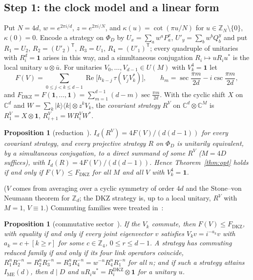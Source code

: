 \documentclass[11pt]{article}
\newtheorem{proposition}[lemma]{Proposition}
\theoremstyle{remark}
\numberwithin{equation}{section}
\newcommand{\Z}{\mathbb{Z}}
\newcommand{\C}{\mathbb{C}}
\renewcommand{\Re}{\operatorname{Re}}
\newcommand{\IME}{I_{\mathrm{ME}}}
\newcommand{\FD}{F_{\mathrm{DKZ}}}
\newcommand{\one}{\mathbf{1}}
\newcommand{\DKZ}{\mathrm{DKZ}}
\begin{document}
\subsection{Step 1: the clock model and a linear form}\label{subsec:clock}
Put $N=4d$, $w=e^{2\pi i/d}$, $z=e^{2\pi i/N}$, and $\kappa(u)=\cot(\pi u/N)$ for $u\in\Z_N\setminus\{0\}$,
$\kappa(0)=0$. Encode a strategy on $\Phi_D$ by $U_x=\sum_aw^aP^x_a$, $U'_y=\sum_bw^bQ^y_b$ and put $R_1=U_2$,
$R_2=(U'_2)^{\mathsf T}$, $R_3=U_1$, $R_4=(U'_1)^{\mathsf T}$; every quadruple of unitaries with $R_i^d=\one$ arises in
this way, and a simultaneous conjugation $R_i\mapsto uR_iu^*$ is the local unitary $u\otimes\bar u$. For unitaries
$V_0,\dots,V_{d-1}\in U(M)$ with $V_k^4=\one$ let
\begin{equation}\label{eq:FV}
F(V)=\sum_{0\le j<k\le d-1}\Re\bigl[h_{k-j}\,\tau(V_jV_k^*)\bigr],\qquad h_m=\sec\frac{\pi m}{2d}-i\csc\frac{\pi m}{2d},
\end{equation}
and $\FD=F(\one,\dots,\one)=\sum_{m=1}^{d-1}(d-m)\sec\frac{\pi m}{2d}$. With the cyclic shift $X$ on $\C^d$ and
$W=\sum_k|k\rangle\langle k|\otimes z^kV_k$, the \emph{covariant strategy} $R^V$ on $\C^d\otimes\C^M$ is
$R^V_1=X\otimes\one$, $R^V_{i+1}=WR^V_iW^*$.

\begin{proposition}[reduction~{\cite[Theorem~2.3]{MSclassical}}]\label{prop:reduction}
$I_d(R^V)=4F(V)/(d(d-1))$ for every covariant strategy, and every projective strategy $R$ on $\Phi_D$ is unitarily
equivalent, by a simultaneous conjugation, to a direct summand of some $R^V$ ($M=4D$ suffices), with
$I_d(R)=4F(V)/(d(d-1))$. Hence Theorem~\ref{thm:opt} holds if and only if $F(V)\le\FD$ for all $M$ and all $V$ with
$V_k^4=\one$.
\end{proposition}

($V$ comes from averaging over a cyclic symmetry of order $4d$ and the Stone--von Neumann theorem for $\Z_d$; the DKZ
strategy is, up to a local unitary, $R^V$ with $M=1$, $V\equiv1$.) Commuting families were treated in~\cite{MSclassical}:

\begin{proposition}[commutative sector~{\cite[Theorem~B, Corollary~C, Proposition~2.4]{MSclassical}}]\label{prop:commutative}
If the $V_k$ commute, then $F(V)\le\FD$, with equality if and only if every joint eigenvector $v$ satisfies
$V_kv=i^{-a_k}v$ with $a_k=c+[k\ge r]$ for some $c\in\Z_4$, $0\le r\le d-1$. A strategy has commuting reduced family if
and only if its four link operators coincide, $R_1^nR_2^{-n}=R_2^nR_3^{-n}=R_3^nR_4^{-n}=w^{-n}R_4^nR_1^{-n}$ for all
$n$; and if such a strategy attains $\IME(d)$, then $d\mid D$ and $uR_iu^*=R_i^{\DKZ}\otimes\one$ for a unitary $u$.
\end{proposition}
\end{document}
